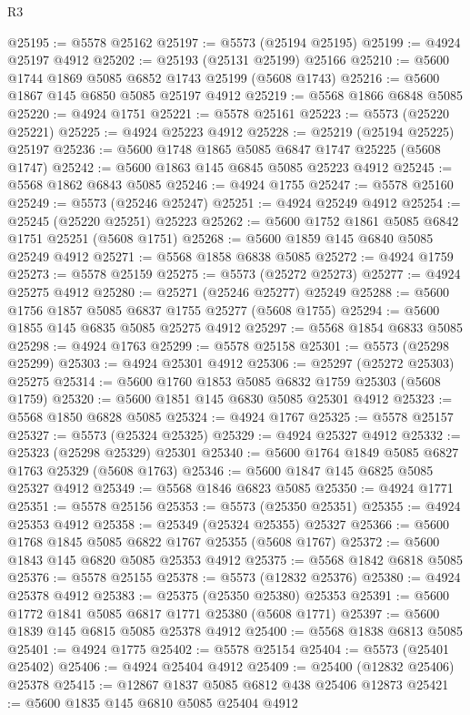 \begin{lexlean}{R3}
\begin{coremodule}
@25195 := @5578 @25162
@25197 := @5573 (@25194 @25195)
@25199 := @4924 @25197 @4912
@25202 := @25193 (@25131 @25199) @25166
@25210 := @5600 @1744 @1869 @5085 @6852 @1743 @25199 (@5608 @1743)
@25216 := @5600 @1867 @145 @6850 @5085 @25197 @4912
@25219 := @5568 @1866 @6848 @5085
@25220 := @4924 @1751
@25221 := @5578 @25161
@25223 := @5573 (@25220 @25221)
@25225 := @4924 @25223 @4912
@25228 := @25219 (@25194 @25225) @25197
@25236 := @5600 @1748 @1865 @5085 @6847 @1747 @25225 (@5608 @1747)
@25242 := @5600 @1863 @145 @6845 @5085 @25223 @4912
@25245 := @5568 @1862 @6843 @5085
@25246 := @4924 @1755
@25247 := @5578 @25160
@25249 := @5573 (@25246 @25247)
@25251 := @4924 @25249 @4912
@25254 := @25245 (@25220 @25251) @25223
@25262 := @5600 @1752 @1861 @5085 @6842 @1751 @25251 (@5608 @1751)
@25268 := @5600 @1859 @145 @6840 @5085 @25249 @4912
@25271 := @5568 @1858 @6838 @5085
@25272 := @4924 @1759
@25273 := @5578 @25159
@25275 := @5573 (@25272 @25273)
@25277 := @4924 @25275 @4912
@25280 := @25271 (@25246 @25277) @25249
@25288 := @5600 @1756 @1857 @5085 @6837 @1755 @25277 (@5608 @1755)
@25294 := @5600 @1855 @145 @6835 @5085 @25275 @4912
@25297 := @5568 @1854 @6833 @5085
@25298 := @4924 @1763
@25299 := @5578 @25158
@25301 := @5573 (@25298 @25299)
@25303 := @4924 @25301 @4912
@25306 := @25297 (@25272 @25303) @25275
@25314 := @5600 @1760 @1853 @5085 @6832 @1759 @25303 (@5608 @1759)
@25320 := @5600 @1851 @145 @6830 @5085 @25301 @4912
@25323 := @5568 @1850 @6828 @5085
@25324 := @4924 @1767
@25325 := @5578 @25157
@25327 := @5573 (@25324 @25325)
@25329 := @4924 @25327 @4912
@25332 := @25323 (@25298 @25329) @25301
@25340 := @5600 @1764 @1849 @5085 @6827 @1763 @25329 (@5608 @1763)
@25346 := @5600 @1847 @145 @6825 @5085 @25327 @4912
@25349 := @5568 @1846 @6823 @5085
@25350 := @4924 @1771
@25351 := @5578 @25156
@25353 := @5573 (@25350 @25351)
@25355 := @4924 @25353 @4912
@25358 := @25349 (@25324 @25355) @25327
@25366 := @5600 @1768 @1845 @5085 @6822 @1767 @25355 (@5608 @1767)
@25372 := @5600 @1843 @145 @6820 @5085 @25353 @4912
@25375 := @5568 @1842 @6818 @5085
@25376 := @5578 @25155
@25378 := @5573 (@12832 @25376)
@25380 := @4924 @25378 @4912
@25383 := @25375 (@25350 @25380) @25353
@25391 := @5600 @1772 @1841 @5085 @6817 @1771 @25380 (@5608 @1771)
@25397 := @5600 @1839 @145 @6815 @5085 @25378 @4912
@25400 := @5568 @1838 @6813 @5085
@25401 := @4924 @1775
@25402 := @5578 @25154
@25404 := @5573 (@25401 @25402)
@25406 := @4924 @25404 @4912
@25409 := @25400 (@12832 @25406) @25378
@25415 := @12867 @1837 @5085 @6812 @438 @25406 @12873
@25421 := @5600 @1835 @145 @6810 @5085 @25404 @4912

\end{coremodule}
\end{lexlean}
